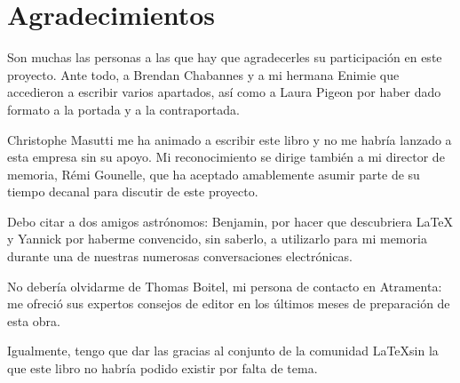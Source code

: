 \section*{Agradecimientos}\thispagestyle{plain}

Son muchas las personas a las que hay que agradecerles su participación en este proyecto. Ante todo, a Brendan Chabannes y a mi hermana Enimie que accedieron a escribir varios apartados, así como a Laura Pigeon por haber dado formato a la portada y a la contraportada.

Christophe Masutti me ha animado a escribir este libro y no me habría lanzado a esta empresa sin su apoyo. Mi reconocimiento se dirige también a mi director de memoria, Rémi Gounelle, que ha aceptado amablemente asumir parte de su tiempo decanal para discutir de este proyecto.

Debo citar a dos amigos astrónomos: Benjamin, por hacer que descubriera \LaTeX{} y Yannick por haberme convencido, sin saberlo, a utilizarlo para mi memoria durante una de nuestras numerosas conversaciones electrónicas.

No debería olvidarme de Thomas Boitel, mi persona de contacto en Atramenta: me ofreció sus expertos consejos de editor en los últimos meses de preparación de esta obra.

Igualmente, tengo que dar las gracias al conjunto de la comunidad \LaTeX sin la que este libro no habría podido existir por falta de tema. 

